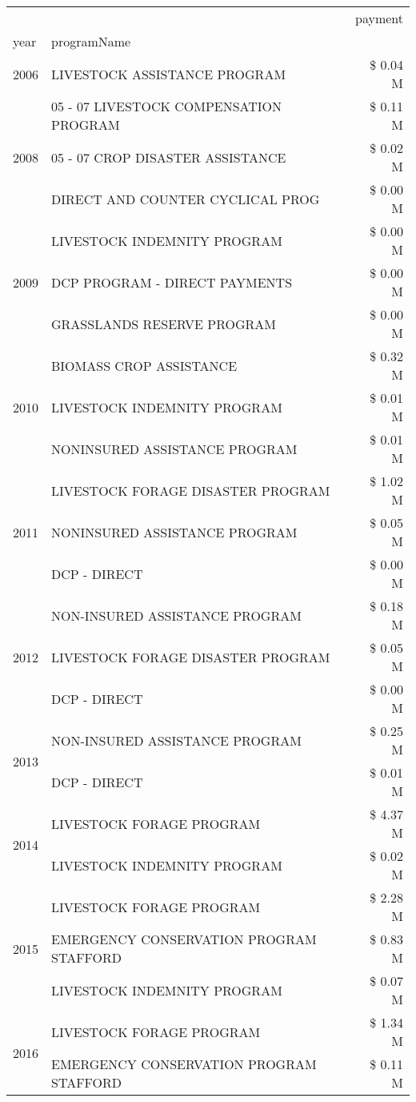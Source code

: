 \begin{tabular}{llr}
\toprule
 &  & payment \\
year & programName &  \\
\midrule
2006 & LIVESTOCK ASSISTANCE PROGRAM & \$ 0.04 M \\
\cline{1-3}
\multirow[t]{3}{*}{2008} & 05 - 07 LIVESTOCK COMPENSATION PROGRAM & \$ 0.11 M \\
 & 05 - 07 CROP DISASTER ASSISTANCE & \$ 0.02 M \\
 & DIRECT AND COUNTER CYCLICAL PROG & \$ 0.00 M \\
\cline{1-3}
\multirow[t]{3}{*}{2009} & LIVESTOCK INDEMNITY PROGRAM & \$ 0.00 M \\
 & DCP PROGRAM - DIRECT PAYMENTS & \$ 0.00 M \\
 & GRASSLANDS RESERVE PROGRAM & \$ 0.00 M \\
\cline{1-3}
\multirow[t]{3}{*}{2010} & BIOMASS CROP ASSISTANCE & \$ 0.32 M \\
 & LIVESTOCK INDEMNITY PROGRAM & \$ 0.01 M \\
 & NONINSURED ASSISTANCE PROGRAM & \$ 0.01 M \\
\cline{1-3}
\multirow[t]{3}{*}{2011} & LIVESTOCK FORAGE DISASTER PROGRAM & \$ 1.02 M \\
 & NONINSURED ASSISTANCE PROGRAM & \$ 0.05 M \\
 & DCP - DIRECT & \$ 0.00 M \\
\cline{1-3}
\multirow[t]{3}{*}{2012} & NON-INSURED ASSISTANCE PROGRAM & \$ 0.18 M \\
 & LIVESTOCK FORAGE DISASTER PROGRAM & \$ 0.05 M \\
 & DCP - DIRECT & \$ 0.00 M \\
\cline{1-3}
\multirow[t]{2}{*}{2013} & NON-INSURED ASSISTANCE PROGRAM & \$ 0.25 M \\
 & DCP - DIRECT & \$ 0.01 M \\
\cline{1-3}
\multirow[t]{2}{*}{2014} & LIVESTOCK FORAGE PROGRAM & \$ 4.37 M \\
 & LIVESTOCK INDEMNITY PROGRAM & \$ 0.02 M \\
\cline{1-3}
\multirow[t]{3}{*}{2015} & LIVESTOCK FORAGE PROGRAM & \$ 2.28 M \\
 & EMERGENCY CONSERVATION PROGRAM STAFFORD & \$ 0.83 M \\
 & LIVESTOCK INDEMNITY PROGRAM & \$ 0.07 M \\
\cline{1-3}
\multirow[t]{3}{*}{2016} & LIVESTOCK FORAGE PROGRAM & \$ 1.34 M \\
 & EMERGENCY CONSERVATION PROGRAM STAFFORD & \$ 0.11 M \\

\end{tabular}

